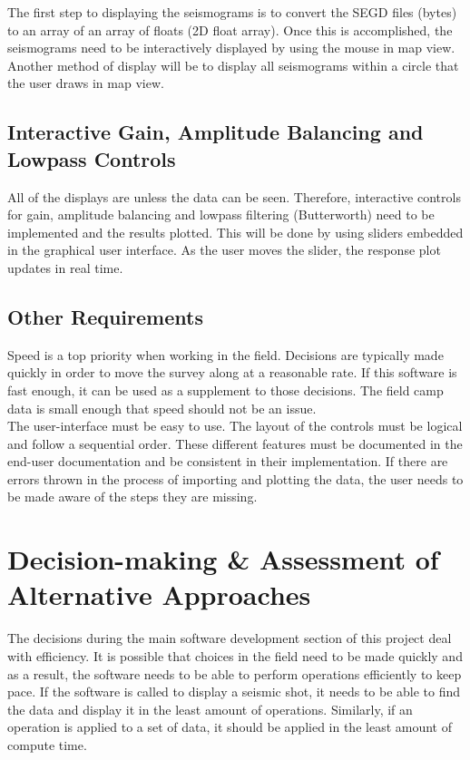 \documentclass[12pt]{article}
\begin{document}
The first step to displaying the seismograms is to convert the SEGD files (bytes) to an array of an array of floats (2D float array). Once this is accomplished, the seismograms need to be interactively displayed by using the mouse in map view. Another method of display will be to display all seismograms within a circle that the user draws in map view. \\

\subsection{Interactive Gain, Amplitude Balancing and Lowpass Controls}

All of the displays are unless the data can be seen. Therefore, interactive controls for gain, amplitude balancing and lowpass filtering (Butterworth) need to be implemented and the results plotted. This will be done by using sliders embedded in the graphical user interface. As the user moves the slider, the response plot updates in real time.

\subsection{Other Requirements}

Speed is a top priority when working in the field. Decisions are typically made quickly in order to move the survey along at a reasonable rate. If this software is fast enough, it can be used as a supplement to those decisions. The field camp data is small enough that speed should not be an issue. \\

The user-interface must be easy to use. The layout of the controls must be logical and follow a sequential order. These different features must be documented in the end-user documentation and be consistent in their implementation. If there are errors thrown in the process of importing and plotting the data, the user needs to be made aware of the steps they are missing.

\section{Decision-making \& Assessment of Alternative Approaches}

The decisions during the main software development section of this project deal with efficiency. It is possible that choices in the field need to be made quickly and as a result, the software needs to be able to perform operations efficiently to keep pace. If the software is called to display a seismic shot, it needs to be able to find the data and display it in the least amount of operations. Similarly, if an operation is applied to a set of data, it should be applied in the least amount of compute time. \\
\end{document}
